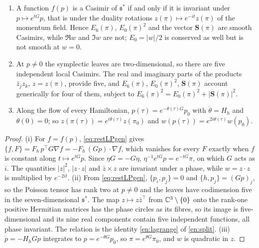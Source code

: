 \begin{theorem}
\label{cl:frozen}
\begin{enumerate}[label=(\roman*),leftmargin=2.2em]
\item A function $f(p)$ is a Casimir of $\mathfrak s^*$ if and only if it is invariant under $p\mapsto e^{tG}p$, that is under the duality rotations
$z(\pi)\mapsto e^{-it}z(\pi)$ of the momentum field. Hence $E_6(\pi)$, $E_0(\pi)^2$ and the vector $\mathbf S(\pi)$ are smooth Casimirs, while $\Re w$
and $\Im w$ are not; $E_0=|w|/2$ is conserved as well but is not smooth at $w=0$.
\item At $p\neq0$ the symplectic leaves are two-dimensional, so there are five independent local Casimirs. The real and imaginary parts of the
products $\bar z_jz_k$, $z=z(\pi)$, provide five, and $E_6(\pi)$, $E_0(\pi)^2$, $\mathbf S(\pi)$ account generically for four of them, subject to
$E_6(\pi)^2=E_0(\pi)^2+|\mathbf S(\pi)|^2$.
\item Along the flow of every Hamiltonian, $p(\tau)=e^{-\theta(\tau)G}p_0$ with $\dot\theta=H_h$ and $\theta(0)=0$; so
$z(\pi(\tau))=e^{i\theta(\tau)}z(\pi_0)$ and $w(p(\tau))=e^{2i\theta(\tau)}w(p_0)$.
\end{enumerate}
\end{theorem}

\begin{proof}
(i) For $f=f(p)$, \eqref{eq:restLPgen} gives $\{f,F\}=F_h\,p^{\!\top}G\nabla f=-F_h\,(Gp)\cdot\nabla f$, which vanishes for every $F$ exactly when $f$
is constant along $t\mapsto e^{tG}p$. Since $\eta G=-G\eta$, $\eta^{-1}e^{tG}p=e^{-tG}\pi$, on which $G$ acts as $i$. The quantities $|z|^2$,
$|z\cdot z|$ and $\bar z\times z$ are invariant under a phase, while $w=z\cdot z$ is multiplied by $e^{-2it}$. (ii) From \eqref{eq:restLPgen},
$\{p_i,p_j\}=0$ and $\{h,p_j\}=(Gp)_j$, so the Poisson tensor has rank two at $p\neq0$ and the leaves have codimension five in the
seven-dimensional $\mathfrak s^*$. The map $z\mapsto z\bar z^{\!\top}$ from $\mathbb{C}^3\setminus\{0\}$ onto the rank-one positive Hermitian matrices has the
phase circles as its fibres, so its image is five-dimensional and its nine real components contain five independent functions, all phase
invariant. The relation is the identity \eqref{en:lagrange} of \cref{en:split}. (iii) $\dot p=-H_hGp$ integrates to
$p=e^{-\theta G}p_0$, so $\pi=e^{\theta G}\pi_0$, and $w$ is quadratic in $z$.
\end{proof}

